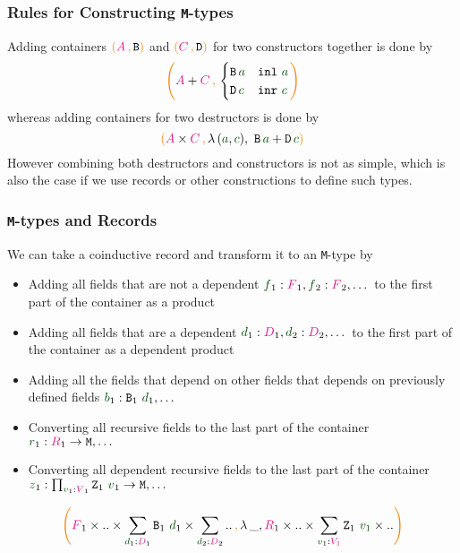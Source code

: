 \documentclass[xelatex,mathserif,serif,notheorems]{beamer} %
\theoremstyle{plain} %
\theoremstyle{definition}
\theoremstyle{remark}
\newcommand*{\term}[1]{\textcolor{green!30!black}{#1}} %
\newcommand*{\type}[1]{\textcolor{magenta!90!black}{#1}}
\newcommand*{\containerpair}[2]{\ensuremath{\colorlet{savedleftcolor}{.}\color{orange}\left(\color{savedleftcolor}#1\,\textcolor{orange}{\mathbf{,}}\,#2\color{orange}\right)\color{savedleftcolor}}}
\newcommand*{\typeformer}[1]{\ensuremath{\mathtt{#1}}}
\begin{document}
\begin{frame}
  \frametitle{Rules for Constructing \texttt{M}-types}
  Adding containers \(\containerpair{\type{A}}{\typeformer{B}}\) and \(\containerpair{\type{C}}{\typeformer{D}}\) for two constructors together is done by
  \begin{equation}
    \containerpair{\type{A} + \type{C}}{ \begin{cases} \typeformer{B}\,\term{a} & \mathtt{inl}~\term{a} \\ \typeformer{D}\,\term{c} & \mathtt{inr}~\term{c} \end{cases}}
  \end{equation}
  whereas adding containers for two destructors is done by
  \begin{equation}
    \containerpair{\type{A} \times \type{C}}{\lambda\,(\term{a},\term{c}),~\typeformer{B}\,\term{a} + \typeformer{D}\,\term{c}}  
  \end{equation}
  However combining both destructors and constructors is not as simple, which is also the case if we use records or other constructions to define such types.
\end{frame}

\begin{frame}
  \frametitle{\texttt{M}-types and Records}
  We can take a coinductive record and transform it to an \texttt{M}-type by
  \begin{itemize}
  \item Adding all fields that are not a dependent \(\term{f}_1 : \type{F}_1,\term{f}_2 : \type{F}_2,\dots\) to the first part of the container as a product
  \item Adding all fields that are a dependent \(\term{d}_1 : \type{D}_1, \term{d}_2 : \type{D}_2, \dots\) to the first part of the container as a dependent product
  \item Adding all the fields that depend on other fields that depends on previously defined fields \(\term{b}_1 : \typeformer{B}_1~\term{d}_1, \dots\)
  \item Converting all recursive fields to the last part of the container \(\term{r}_1 : \type{R}_1 \rightarrow \typeformer{M},\dots\)
  \item Converting all dependent recursive fields to the last part of the container \(\term{z}_1 : \prod_{\term{v}_1 : \type{V}_1} \typeformer{Z}_1~\term{v}_1 \rightarrow \typeformer{M},\dots\)
  \end{itemize}
  \begin{equation}
    \containerpair{\type{F}_1 \times .. \times \sum_{\term{d}_1 : \type{D}_1} \typeformer{B}_1~\term{d}_1 \times \sum_{\term{d}_2 : \type{D}_2} ..}{\lambda\,\_,\type{R}_1 \times .. \times \sum_{\term{v}_1 : \type{V_1}} \typeformer{Z}_1~\term{v_1} \times ..}
  \end{equation}
\end{frame}
\end{document}
